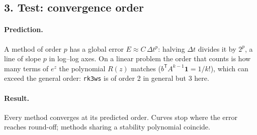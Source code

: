 \documentclass[11pt,a4paper]{article}
\begin{document}
\newpage
\subsection*{3. Test: convergence order}

\paragraph{Prediction.} A method of order $p$ has a global error
$E \approx C\,\Delta t^{p}$: halving $\Delta t$ divides it by $2^p$, a line of
slope $p$ in log--log axes. On a linear problem the order that counts is how
many terms of $e^{z}$ the polynomial $R(z)$ matches
($b^{\mathsf T}A^{k-1}\mathbf{1} = 1/k!$), which can exceed the general order:
\texttt{rk3ws} is of order 2 in general but 3 here.

\paragraph{Result.}
\begin{center}

\end{center}

\begin{center}
\end{center}
Every method converges at its predicted order. Curves stop where the error
reaches round-off; methods sharing a stability polynomial coincide.
\end{document}
